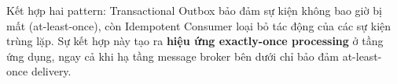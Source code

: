 \documentclass[../DoAn.tex]{subfiles}
\begin{document}
Kết hợp hai pattern: Transactional Outbox bảo đảm sự kiện không bao giờ bị mất (at-least-once),
còn Idempotent Consumer loại bỏ tác động của các sự kiện trùng lặp. Sự kết hợp này tạo ra
\textbf{hiệu ứng exactly-once processing} ở tầng ứng dụng, ngay cả khi hạ tầng message broker
bên dưới chỉ bảo đảm at-least-once delivery.



\end{document}
